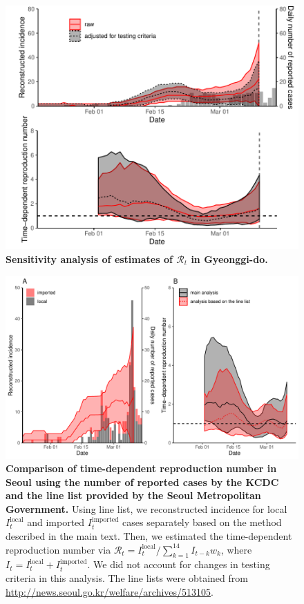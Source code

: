 \pagebreak

\begin{figure}[!ht]
\includegraphics[width=\textwidth]{figure_R_t_gyeonggi.pdf}
\caption{
\textbf{Sensitivity analysis of estimates of $\mathcal R_t$ in Gyeonggi-do.}
}
\end{figure}

\pagebreak

\begin{figure}[!ht]
\includegraphics[width=\textwidth]{figure_R_t_seoul_linelist.pdf}
\caption{
\textbf{Comparison of time-dependent reproduction number in Seoul using the number of reported cases by the KCDC and the line list provided by the Seoul Metropolitan Government.}
Using line list, we reconstructed incidence for local $I_t^{\textrm{local}}$ and imported $I_t^{\textrm{imported}}$ cases separately based on the method described in the main text. Then, we estimated the time-dependent reproduction number via $\mathcal R_t = I_t^{\textrm{local}}/\sum_{k=1}^{14} I_{t-k} w_k$, where $I_t=I_t^{\textrm{local}}+I_t^{\textrm{imported}}$. We did not account for changes in testing criteria in this analysis.
The line lists were obtained from \url{http://news.seoul.go.kr/welfare/archives/513105}.
}
\end{figure}
